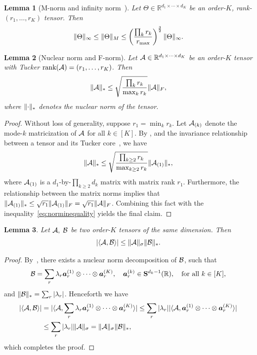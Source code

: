 \documentclass[11pt]{article}
\theoremstyle{plain}
\newtheorem{lem}{Lemma}
\theoremstyle{definition}
\begin{document}
\begin{lem}[M-norm and infinity norm~\citep{ghadermarzy2019near}]\label{lem:Mnormbound}
Let $\Theta\in\mathbb{R}^{d_1\times \cdots \times d_K}$ be an order-$K$, rank-$(r_1,\ldots,r_K)$ tensor. Then
\[
\lVert\Theta\rVert_\infty\leq \lVert\Theta\rVert_M\leq \left(\prod_k r_k \over r_{\max}\right)^{3\over 2} \lVert\Theta\rVert_\infty.
\]
\end{lem}


\begin{lem}[Nuclear norm and F-norm] \label{lem:nuclear}
Let $\mathcal{A}\in\mathbb{R}^{d_1\times\cdots\times d_K}$ be an order-$K$ tensor with Tucker $\text{rank}(\mathcal{A})=(r_1,\ldots,r_K)$. Then
\[
\lVert\mathcal{A}\rVert_* \leq \sqrt{\prod_k r_k\over \max_k r_k} \lVert\mathcal{A}\rVert_F,
\]
where $\lVert\cdot\rVert_*$ denotes the nuclear norm of the tensor.
\end{lem}

\begin{proof}
Without loss of generality, suppose $r_1=\min_k r_k$. Let $\mathcal{A}_{(k)}$ denote the mode-$k$ matricization of $\mathcal{A}$ for all $k\in[K]$. By \citet[Corollary 4.11]{wang2017operator}, and the invariance relationship between a tensor and its Tucker core~\citep[Section 6]{jiang2017tensor}, we have
\begin{equation}\label{eq:norminequality}
\lVert\mathcal{A}\rVert_* \leq \sqrt{\prod_{k\geq 2} r_k \over \max_{k\geq 2} r_k} \lVert\mathcal{A}_{(1)}\rVert_*,
\end{equation}
where $\mathcal{A}_{(1)}$ is a $d_1$-by-$\prod_{k\geq 2}d_k$ matrix with matrix rank $r_1$. Furthermore, the relationship between the matrix norms implies that $\lVert\mathcal{A}_{(1)}\rVert_*\leq \sqrt{r_1}\lVert\mathcal{A}_{(1)}\rVert_F=\sqrt{r_1}\lVert\mathcal{A}\rVert_F$. Combining this fact with the inequality~\eqref{eq:norminequality} yields the final claim.
\end{proof}



\begin{lem} \label{lem:inq}
Let $\mathcal{A}, \; \mathcal{B}$ be two order-$K$ tensors of the same dimension. Then
\[
|\langle \mathcal{A},\mathcal{B}\rangle| \leq \lVert\mathcal{A}\rVert_\sigma   \lVert\mathcal{B}\rVert_*.
\]
\end{lem}

\begin{proof}
By~\citet[Proposition 3.1]{friedland2018nuclear}, there exists a nuclear norm decomposition of $\mathcal{B}$, such that
\[
\mathcal{B}=\sum_{r} \lambda_r \bm{a}^{(1)}_r\otimes \cdots\otimes \bm{a}^{(K)}_r,\quad \bm{a}_r^{(k)}\in\mathbf{S}^{d_k-1}(\mathbb{R}),\quad \text{for all }k\in[K],
\]
and $\lVert\mathcal{B}\rVert_*=\sum_{r}|\lambda_r|$. Henceforth we have
\begin{align*}
|\langle \mathcal{A},\mathcal{B}\rangle|&=| \langle \mathcal{A}, \sum_{r} \lambda_r \bm{a}^{(1)}_r\otimes \cdots\otimes \bm{a}^{(K)}_r \rangle|\leq \sum_r |\lambda_r| |\langle \mathcal{A}, \bm{a}^{(1)}_r \otimes \cdots\otimes \bm{a}^{(K)}_r \rangle|\\
&\leq \sum_{r}|\lambda_r| \lVert\mathcal{A}\rVert_\sigma= \lVert\mathcal{A}\rVert_\sigma\lVert\mathcal{B}\rVert_*,
\end{align*}
which completes the proof.
\end{proof}
\end{document}
